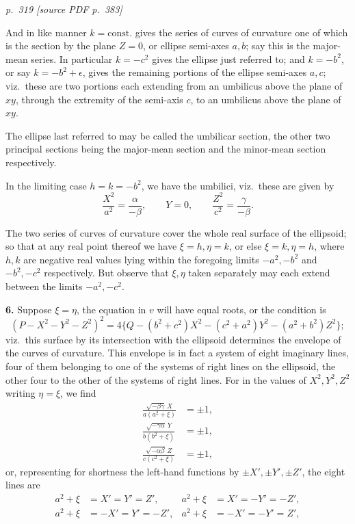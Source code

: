 \documentclass[11pt,a4paper]{article}
\newcommand{\pagemarker}[2]{\par\bigskip\noindent\textit{p.~#1 [source PDF p.~#2]}\par\smallskip}
\begin{document}
\clearpage

\pagemarker{319}{383}

And in like manner $k=\mathrm{const.}$ gives the series of curves of curvature one of which is the section by the plane $Z=0$, or ellipse semi-axes $a,b$; say this is the major-mean series. In particular $k=-c^2$ gives the ellipse just referred to; and $k=-b^2$, or say $k=-b^2+\epsilon$, gives the remaining portions of the ellipse semi-axes $a,c$; viz.\ these are two portions each extending from an umbilicus above the plane of $xy$, through the extremity of the semi-axis $c$, to an umbilicus above the plane of $xy$.

The ellipse last referred to may be called the umbilicar section, the other two principal sections being the major-mean section and the minor-mean section respectively.

In the limiting case $h=k=-b^2$, we have the umbilici, viz.\ these are given by
\[
\frac{X^2}{a^2}=\frac{\alpha}{-\beta},\qquad Y=0,\qquad \frac{Z^2}{c^2}=\frac{\gamma}{-\beta}.
\]

The two series of curves of curvature cover the whole real surface of the ellipsoid; so that at any real point thereof we have $\xi=h,\eta=k$, or else $\xi=k,\eta=h$, where $h,k$ are negative real values lying within the foregoing limits $-a^2,-b^2$ and $-b^2,-c^2$ respectively. But observe that $\xi,\eta$ taken separately may each extend between the limits $-a^2,-c^2$.

\textbf{6.} Suppose $\xi=\eta$, the equation in $v$ will have equal roots, or the condition is
\[
(P-X^2-Y^2-Z^2)^2=4\{Q-(b^2+c^2)X^2-(c^2+a^2)Y^2-(a^2+b^2)Z^2\};
\]
viz.\ this surface by its intersection with the ellipsoid determines the envelope of the curves of curvature. This envelope is in fact a system of eight imaginary lines, four of them belonging to one of the systems of right lines on the ellipsoid, the other four to the other of the systems of right lines. For in the values of $X^2,Y^2,Z^2$ writing $\eta=\xi$, we find
\begin{align*}
\frac{\sqrt{-\beta\gamma}\,X}{a(a^2+\xi)}&=\pm 1,\\
\frac{\sqrt{-\gamma\alpha}\,Y}{b(b^2+\xi)}&=\pm 1,\\
\frac{\sqrt{-\alpha\beta}\,Z}{c(c^2+\xi)}&=\pm 1,
\end{align*}
or, representing for shortness the left-hand functions by $\pm X',\pm Y',\pm Z'$, the eight lines are
\begin{align*}
a^2+\xi&=X'=Y'=Z',&
a^2+\xi&=X'=-Y'=-Z',\\
a^2+\xi&=-X'=Y'=-Z',&
a^2+\xi&=-X'=-Y'=Z',
\end{align*}
\end{document}
